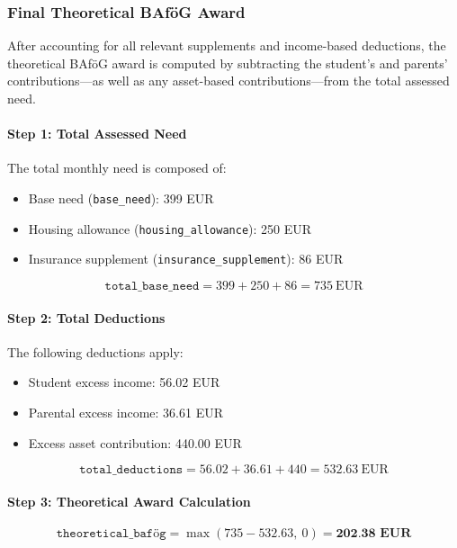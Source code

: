 \subsubsection*{Final Theoretical BAföG Award}

After accounting for all relevant supplements and income-based deductions, the theoretical BAföG award is computed by subtracting the student’s and parents’ contributions—as well as any asset-based contributions—from the total assessed need.

\paragraph{Step 1: Total Assessed Need}

The total monthly need is composed of:
\begin{itemize}
    \item Base need (\texttt{base\_need}): 399 EUR
    \item Housing allowance (\texttt{housing\_allowance}): 250 EUR
    \item Insurance supplement (\texttt{insurance\_supplement}): 86 EUR
\end{itemize}

\[
\texttt{total\_base\_need} = 399 + 250 + 86 = 735~\text{EUR}
\]

\paragraph{Step 2: Total Deductions}

The following deductions apply:
\begin{itemize}
    \item Student excess income: 56.02 EUR
    \item Parental excess income: 36.61 EUR
    \item Excess asset contribution: 440.00 EUR
\end{itemize}

\[
\texttt{total\_deductions} = 56.02 + 36.61 + 440 = 532.63~\text{EUR}
\]

\paragraph{Step 3: Theoretical Award Calculation}

\[
\texttt{theoretical\_bafög} = \max(735 - 532.63,\ 0) = \textbf{202.38~EUR}
\]

